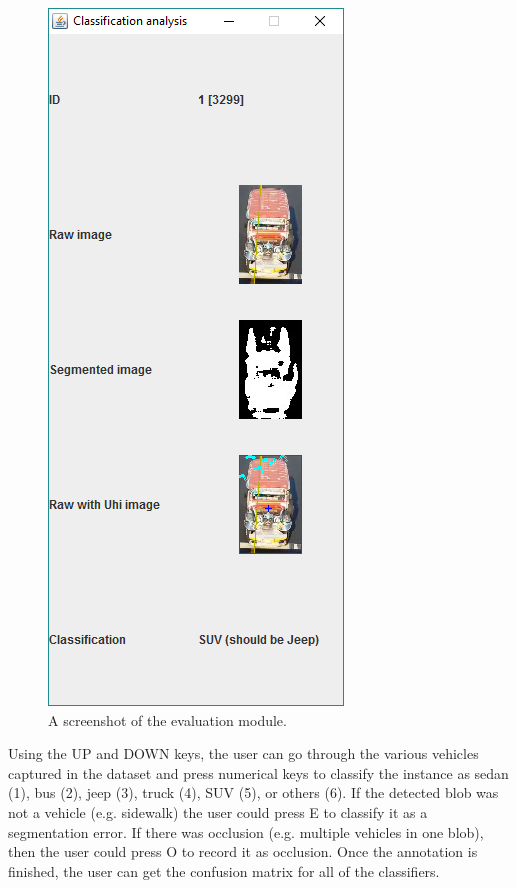 \documentclass[conference]{IEEEtran}
\begin{document}
\begin{figure}[!h]
\centering
\includegraphics[scale=0.9]{evaluation_module.png}
\caption{A screenshot of the evaluation module.}
\label{fig_evaluation_module}
\end{figure}

Using the UP and DOWN keys, the user can go through the various vehicles captured in the dataset and press numerical keys to classify the instance as sedan (1), bus (2), jeep (3), truck (4), SUV (5), or others (6). If the detected blob was not a vehicle (e.g. sidewalk) the user could press E to classify it as a segmentation error. If there was occlusion (e.g. multiple vehicles in one blob), then the user could press O to record it as occlusion. Once the annotation is finished, the user can get the confusion matrix for all of the classifiers.
\end{document}
